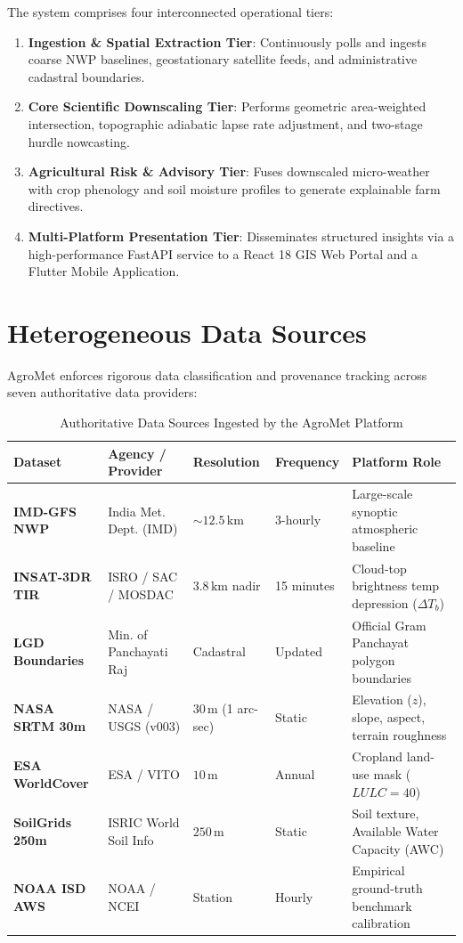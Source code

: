 \documentclass[11pt,a4paper,oneside]{report}
\begin{document}
The system comprises four interconnected operational tiers:
\begin{enumerate}[leftmargin=*]
    \item \textbf{Ingestion \& Spatial Extraction Tier}: Continuously polls and ingests coarse NWP baselines, geostationary satellite feeds, and administrative cadastral boundaries.
    \item \textbf{Core Scientific Downscaling Tier}: Performs geometric area-weighted intersection, topographic adiabatic lapse rate adjustment, and two-stage hurdle nowcasting.
    \item \textbf{Agricultural Risk \& Advisory Tier}: Fuses downscaled micro-weather with crop phenology and soil moisture profiles to generate explainable farm directives.
    \item \textbf{Multi-Platform Presentation Tier}: Disseminates structured insights via a high-performance FastAPI service to a React 18 GIS Web Portal and a Flutter Mobile Application.
\end{enumerate}

\section{Heterogeneous Data Sources}
AgroMet enforces rigorous data classification and provenance tracking across seven authoritative data providers:

\begin{table}[htbp]
\centering
\small
\caption{Authoritative Data Sources Ingested by the AgroMet Platform}
\label{tab:data_sources}
\begin{tabularx}{\textwidth}{l p{3.2cm} l l X}
\toprule
\textbf{Dataset} & \textbf{Agency / Provider} & \textbf{Resolution} & \textbf{Frequency} & \textbf{Platform Role} \\
\midrule
\textbf{IMD-GFS NWP} & India Met. Dept. (IMD) & $\sim 12.5\,\text{km}$ & 3-hourly & Large-scale synoptic atmospheric baseline \\
\textbf{INSAT-3DR TIR} & ISRO / SAC / MOSDAC & $3.8\,\text{km}$ nadir & 15 minutes & Cloud-top brightness temp depression ($\Delta T_b$) \\
\textbf{LGD Boundaries} & Min. of Panchayati Raj & Cadastral & Updated & Official Gram Panchayat polygon boundaries \\
\textbf{NASA SRTM 30m} & NASA / USGS (v003) & $30\,\text{m}$ (1 arc-sec) & Static & Elevation ($z$), slope, aspect, terrain roughness \\
\textbf{ESA WorldCover} & ESA / VITO & $10\,\text{m}$ & Annual & Cropland land-use mask ($LULC = 40$) \\
\textbf{SoilGrids 250m} & ISRIC World Soil Info & $250\,\text{m}$ & Static & Soil texture, Available Water Capacity (AWC) \\
\textbf{NOAA ISD AWS} & NOAA / NCEI & Station & Hourly & Empirical ground-truth benchmark calibration \\
\bottomrule
\end{tabularx}
\end{table}
\end{document}
